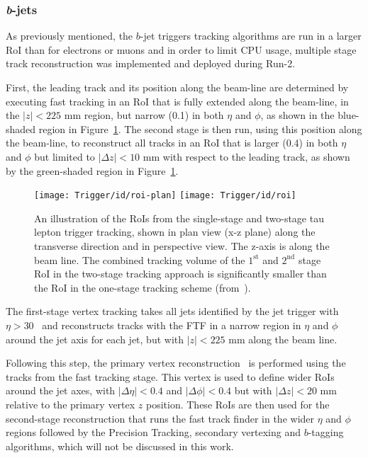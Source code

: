 			\subsubsection*{\emph{b}-jets}

				As previously mentioned, the $b$-jet triggers tracking algorithms are run in a larger \ac{RoI} than for electrons or muons and in order to limit CPU usage, multiple stage track reconstruction was implemented and deployed during Run-2.

				First, the leading track and its position along the beam-line are determined by executing fast tracking in an \ac{RoI} that is fully extended along the beam-line, in the $|z|<225$ mm region, but narrow (0.1) in both $\eta$ and $\phi$, as shown in the blue-shaded region in Figure~\ref{fig:idroi}. The second stage is then run, using this position along the beam-line, to reconstruct all tracks in an \ac{RoI} that is larger (0.4) in both $\eta$ and $\phi$ but limited to $|\Delta z|<10$ mm with respect to the leading track, as shown by the green-shaded region in Figure~\ref{fig:idroi}.

				\begin{figure}[!htb]
					\centering
					\texttt{[image: Trigger/id/roi-plan]}
					\texttt{[image: Trigger/id/roi]}
					\caption{An illustration of the \ac{RoI}s from the single-stage and two-stage tau lepton trigger tracking, shown in plan view (x-z plane) along the transverse direction and in perspective view. The z-axis is along the beam line. The combined tracking volume of the $1^{\mathrm{st}}$ and $2^{\mathrm{nd}}$ stage \ac{RoI} in the two-stage tracking approach is significantly smaller than the \ac{RoI} in the one-stage tracking scheme (from~\cite{ATLASTrigger2015}).}
					\label{fig:idroi}
				\end{figure}

				The first-stage vertex tracking takes all jets identified by the jet trigger with $\eta > 30$ \GeV\ and reconstructs tracks with the \ac{FTF} in a narrow region in $\eta$ and $\phi$ around the jet axis for each jet, but with $|z|<225$ mm along the beam line.
				
				Following this step, the primary vertex reconstruction~\cite{ATLAS-CONF-2010-069} is performed using the tracks from the fast tracking stage. This vertex is used to define wider \ac{RoI}s around
				the jet axes, with $|\Delta\eta|<0.4$ and $|\Delta\phi|<0.4$ but with $|\Delta z|<20$ mm relative to the primary vertex $z$ position. These \ac{RoI}s are then used for the second-stage 
				reconstruction that runs the fast track finder in the wider $\eta$ and $\phi$ regions followed by the Precision Tracking, secondary vertexing and $b$-tagging algorithms, which will not be discussed in this work.


